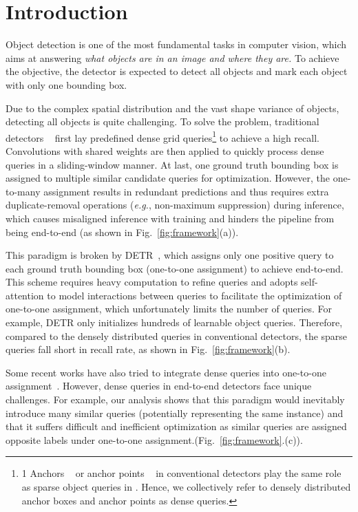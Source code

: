 \documentclass[10pt,twocolumn,letterpaper]{article}
\begin{document}
\section{Introduction} \label{sec:intro} Object detection is one of the most fundamental tasks in computer vision, which aims at answering \emph{what objects are in an image and where they are.} To achieve the objective, the detector is expected to detect all objects and mark each object with only one bounding box.

Due to the complex spatial distribution and the vast shape variance of objects, detecting all objects is quite challenging. To solve the problem, traditional detectors ~\cite{ren2015faster, lin2017focal, tian2019fcos}  first lay predefined dense grid queries\footnote{1 Anchors ~\cite{ren2015faster, lin2017focal} or anchor points ~\cite{tian2019fcos}  in conventional detectors play the same role as sparse object queries in \cite{carion2020end}. Hence, we collectively refer to densely distributed anchor boxes and anchor points as dense queries.} to achieve a high recall. Convolutions with shared weights are then applied to quickly process dense queries in a sliding-window manner. At last, one ground truth bounding box is assigned to multiple similar candidate queries for optimization. However, the one-to-many assignment results in redundant predictions and thus requires extra duplicate-removal operations  (\emph{e.g.}, non-maximum suppression) during inference, which causes misaligned inference with training and hinders the pipeline from being end-to-end (as shown in Fig.~\ref{fig:framework}(a)). 


This paradigm is broken by DETR~\cite{carion2020end}, which assigns only one positive query to each ground truth bounding box (one-to-one assignment) to achieve end-to-end. This scheme requires heavy computation to refine queries and adopts self-attention to model interactions between queries to facilitate the optimization of one-to-one assignment, which unfortunately limits the number of queries. For example, DETR only initializes hundreds of learnable object queries. Therefore, compared to the densely distributed queries in conventional detectors, the sparse queries fall short in recall rate, as shown in Fig.~\ref{fig:framework}(b).

Some recent works have also tried to integrate dense queries into one-to-one assignment~\cite{wang2021end, pmlr-v139-sun21b, yao2021efficient}. However, dense queries in end-to-end detectors face unique challenges. For example, our analysis shows that this paradigm would inevitably introduce many similar queries (potentially representing the same instance) and that it suffers difficult and inefficient optimization as similar queries are assigned opposite labels under one-to-one assignment.(Fig.~\ref{fig:framework}.(c)). 
\end{document}
